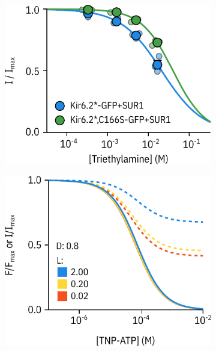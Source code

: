 \begin{figure}[h]
\begin{subfigure}[t]{0.45\textwidth}
	\end{subfigure}
	\vfill
	\begin{subfigure}[t]{0.45\textwidth}
		\caption{}\label{ch5fig:tea_drc}
		\centering
		\includegraphics[width=\textwidth]{tea_drc.pdf}
	\end{subfigure}
	\hfill
	\begin{subfigure}[t]{0.45\textwidth}
		\caption{}\label{ch5fig:l_d_sim}
		\centering
		\includegraphics[width=\textwidth]{c166s_param_sim_1.pdf}
	\end{subfigure}
	\caption[C166S alters apparent nucleotide sensitivity, but not binding]{
	}\label{ch5fig:c166s_1}
\end{figure}

